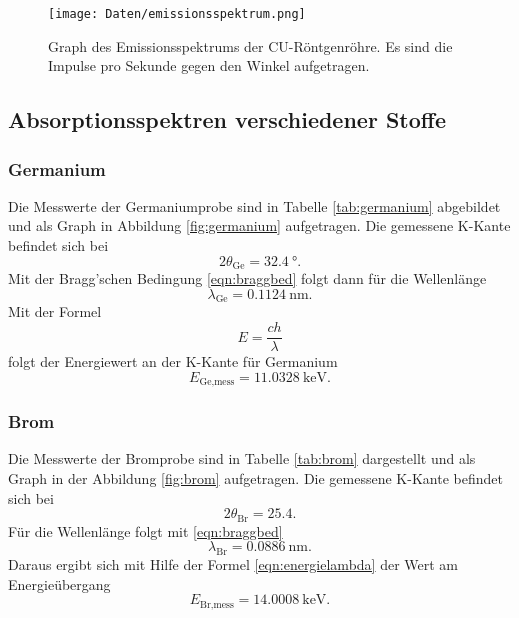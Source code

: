 \begin{figure}
  \centering
  \texttt{[image: Daten/emissionsspektrum.png]}
  \caption{Graph des Emissionsspektrums der CU-Röntgenröhre. Es sind die
  Impulse pro Sekunde gegen den Winkel aufgetragen.}
  \label{fig:emission}
\end{figure}

\subsection{Absorptionsspektren verschiedener Stoffe}

\subsubsection{Germanium}

Die Messwerte der Germaniumprobe sind in Tabelle \ref{tab:germanium} abgebildet
und als Graph in Abbildung \ref{fig:germanium} aufgetragen.
Die gemessene K-Kante befindet sich bei
\begin{equation}
  2\theta_\text{Ge} = \SI{32.4}{\degree}.
\end{equation}
Mit der Bragg'schen Bedingung \eqref{eqn:braggbed} folgt dann für die
Wellenlänge
\begin{equation}
  \lambda_\text{Ge} = \SI{0.1124}{\nano\meter}.
\end{equation}
Mit der Formel
\begin{equation}
  E = \frac{c h}{\lambda}
  \label{eqn:energielambda}
\end{equation}
folgt der Energiewert an der K-Kante für Germanium
\begin{equation}
  E_\text{Ge,mess} = \SI{11.0328}{\kilo\electronvolt}.
\end{equation}

\subsubsection{Brom}

Die Messwerte der Bromprobe sind in Tabelle \ref{tab:brom} dargestellt und als
Graph in der Abbildung \ref{fig:brom} aufgetragen.
Die gemessene K-Kante befindet sich bei
\begin{equation}
  2\theta_\text{Br} = 25.4 .
\end{equation}
Für die Wellenlänge folgt mit \eqref{eqn:braggbed}
\begin{equation}
  \lambda_\text{Br} = \SI{0.0886}{\nano\meter}.
\end{equation}
Daraus ergibt sich mit Hilfe der Formel \eqref{eqn:energielambda}
der Wert am Energieübergang
\begin{equation}
  E_\text{Br,mess} = \SI{14.0008}{\kilo\electronvolt}.
\end{equation}

